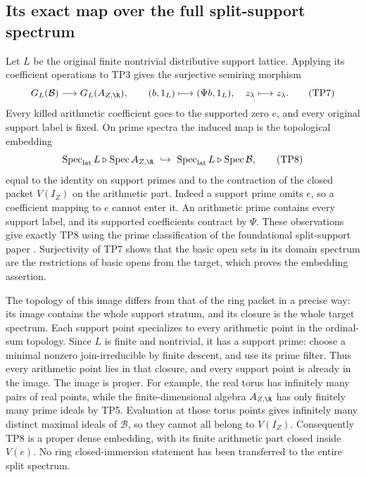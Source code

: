 \documentclass[11pt,a4paper]{article}
\theoremstyle{definition}\newtheorem{definition}[theorem]{Definition}
\newcommand{\Spec}{\operatorname{Spec}}\newcommand{\SpecMon}{\operatorname{Spec}_{\mathrm{mon}}}
\newcommand{\SpecLat}{\operatorname{Spec}_{\mathrm{lat}}}
\begin{document}
\subsection{Its exact map over the full split-support spectrum}
Let $L$ be the original finite nontrivial distributive support
lattice. Applying its coefficient operations to TP3 gives the
surjective semiring morphism
\[
 G_L(\mathcal B)\longrightarrow G_L(A_{Z,\R}),\qquad
 (b,1_L)\longmapsto(\Psi b,1_L),\quad
 z_\lambda\longmapsto z_\lambda.
 \tag{TP7}\label{tp:split}
\]
Every killed arithmetic coefficient goes to the supported zero
$e$, and every original support label is fixed. On prime spectra
the induced map is the topological embedding
\[
 \SpecLat L\triangleright\Spec A_{Z,\R}
 \ \hookrightarrow\
 \SpecLat L\triangleright\Spec\mathcal B,
 \tag{TP8}\label{tp:spectrum}
\]
equal to the identity on support primes and to the contraction
of the closed packet $V(I_Z)$ on the arithmetic part.
Indeed a support prime omits $e$, so a coefficient mapping to
$e$ cannot enter it. An arithmetic prime contains every support
label, and its supported coefficients contract by $\Psi$.
These observations give exactly TP8 using the prime classification
of the foundational split-support paper \cite{support}.
Surjectivity of TP7 shows that the basic open sets in its domain
spectrum are the restrictions of basic opens from the target,
which proves the embedding assertion.

The topology of this image differs from that of the ring packet
in a precise way: its image contains the whole support stratum,
and its closure is the whole target spectrum. Each support point
specializes to every arithmetic point in the ordinal-sum topology.
Since $L$ is finite and nontrivial, it has a support prime: choose
a minimal nonzero join-irreducible by finite descent, and use its
prime filter. Thus every arithmetic point lies in that closure,
and every support point is already in the image.
The image is proper. For example, the real torus has infinitely
many pairs of real points, while the finite-dimensional algebra
$A_{Z,\R}$ has only finitely many prime ideals by TP5. Evaluation
at those torus points gives infinitely many distinct maximal
ideals of $\mathcal B$, so they cannot all belong to $V(I_Z)$.
Consequently TP8 is a proper dense embedding, with its finite
arithmetic part closed inside $V(e)$. No ring closed-immersion
statement has been transferred to the entire split spectrum.
\end{document}
